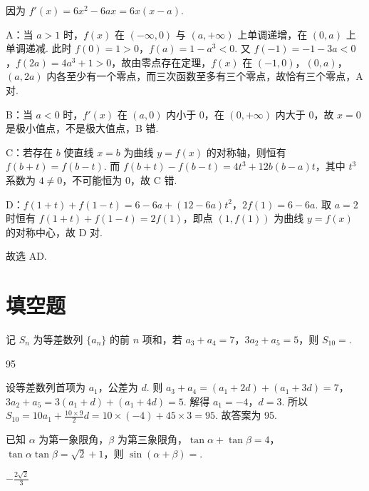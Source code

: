 \begin{solution}
因为
\(f'(x)=6x^2-6ax=6x(x-a)\).

A：当 \(a>1\) 时，\(f(x)\) 在 \((-\infty,0)\) 与 \((a,+\infty)\) 上单调递增，在 \((0,a)\) 上单调递减. 此时 \(f(0)=1>0\)，\(f(a)=1-a^3<0\). 又 \(f(-1)=-1-3a<0\)，\(f(2a)=4a^3+1>0\)，故由零点存在定理，\(f(x)\) 在 \((-1,0)\)，\((0,a)\)，\((a,2a)\) 内各至少有一个零点，而三次函数至多有三个零点，故恰有三个零点，A 对.

B：当 \(a<0\) 时，\(f'(x)\) 在 \((a,0)\) 内小于 \(0\)，在 \((0,+\infty)\) 内大于 \(0\)，故 \(x=0\) 是极小值点，不是极大值点，B 错.

C：若存在 \(b\) 使直线 \(x=b\) 为曲线 \(y=f(x)\) 的对称轴，则恒有 \(f(b+t)=f(b-t)\). 而 \(f(b+t)-f(b-t)=4t^3+12b(b-a)t\)，其中 \(t^3\) 系数为 \(4\ne 0\)，不可能恒为 \(0\)，故 C 错.

D：\(f(1+t)+f(1-t)=6-6a+(12-6a)t^2\)，\(2f(1)=6-6a\). 取 \(a=2\) 时恒有 \(f(1+t)+f(1-t)=2f(1)\)，即点 \((1,f(1))\) 为曲线 \(y=f(x)\) 的对称中心，故 D 对.

故选 AD.
\end{solution}
\section{填空题}

\begin{problem}
记 \(S_n\) 为等差数列 \(\{a_n\}\) 的前 \(n\) 项和，若 \(a_3+a_4=7\)，\(3a_2+a_5=5\)，则 \(S_{10}=\)\fillinblank{}.
\end{problem}

\begin{answer}
95
\end{answer}

\begin{solution}
设等差数列首项为 \(a_1\)，公差为 \(d\). 则
\(a_3+a_4=(a_1+2d)+(a_1+3d)=7\)，
\(3a_2+a_5=3(a_1+d)+(a_1+4d)=5\).
解得
\(a_1=-4\)，\(d=3\).
所以
\(S_{10}=10a_1+\frac{10\times 9}{2}d=10\times(-4)+45\times 3=95\).
故答案为 95.
\end{solution}

\begin{problem}
已知 \(\alpha\) 为第一象限角，\(\beta\) 为第三象限角，\(\tan\alpha+\tan\beta=4\)，\(\tan\alpha\tan\beta=\sqrt2+1\)，则 \(\sin(\alpha+\beta)=\)\fillinblank{}.
\end{problem}

\begin{answer}
\(-\frac{2\sqrt2}{3}\)
\end{answer}

